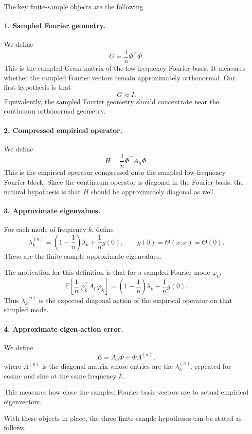 \documentclass[11pt]{article}
\begin{document}
The key finite-sample objects are the following.

\paragraph{1. Sampled Fourier geometry.}
We define
$$
	G=\frac{1}{n}\Phi^\top\Phi.
$$
This is the sampled Gram matrix of the low-frequency Fourier basis. It measures whether the sampled Fourier vectors remain approximately orthonormal. Our first hypothesis is that
$$
	G \approx I.
$$
Equivalently, the sampled Fourier geometry should concentrate near the continuum orthonormal geometry.

\paragraph{2. Compressed empirical operator.}
We define
$$
	H=\frac{1}{n}\Phi^\top A_n\Phi.
$$
This is the empirical operator compressed onto the sampled low-frequency Fourier block. Since the continuum operator is diagonal in the Fourier basis, the natural hypothesis is that $H$ should be approximately diagonal as well.

\paragraph{3. Approximate eigenvalues.}
For each mode of frequency $k$, define
$$
	\lambda_k^{(n)}
	=
	\left(1-\frac{1}{n}\right)\lambda_k+\frac{1}{n}g(0),
	\qquad
	g(0)=\Theta(x,x)=\Theta(0).
$$
These are the finite-sample approximate eigenvalues.

The motivation for this definition is that for a sampled Fourier mode $\varphi_k$,
$$
	\mathbb{E}\!\left[\frac{1}{n}\,\varphi_k^\top A_n\varphi_k\right]
	=
	\left(1-\frac{1}{n}\right)\lambda_k+\frac{1}{n}g(0).
$$
Thus $\lambda_k^{(n)}$ is the expected diagonal action of the empirical operator on that sampled mode.

\paragraph{4. Approximate eigen-action error.}
We define
$$
	E=A_n\Phi-\Phi\Lambda^{(n)},
$$
where $\Lambda^{(n)}$ is the diagonal matrix whose entries are the $\lambda_k^{(n)}$, repeated for cosine and sine at the same frequency $k$.

This measures how close the sampled Fourier basis vectors are to actual empirical eigenvectors.

With these objects in place, the three finite-sample hypotheses can be stated as follows.
\end{document}
